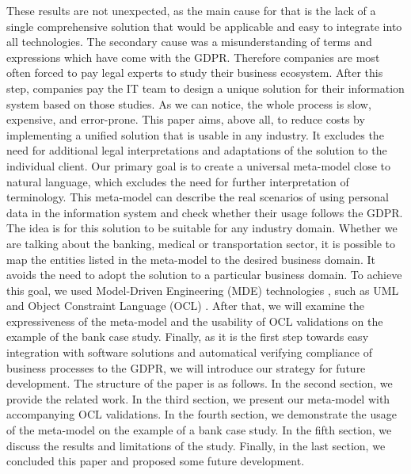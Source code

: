 \documentclass[11pt,english]{article}
\begin{document}
\newline These results are not unexpected, as the main cause for that is the lack of a single comprehensive solution that would be applicable and easy to integrate into all technologies. The secondary cause was a misunderstanding of terms and expressions which have come with the GDPR. Therefore companies are most often forced to pay legal experts to study their business ecosystem. After this step, companies pay the IT team to design a unique solution for their information system based on those studies. As we can notice, the whole process is slow, expensive, and error-prone. \newline This paper aims, above all, to reduce costs by implementing a unified solution that is usable in any industry. It excludes the need for additional legal interpretations and adaptations of the solution to the individual client. Our primary goal is to create a universal meta-model close to natural language, which excludes the need for further interpretation of terminology. This meta-model can describe the real scenarios of using personal data in the information system and check whether their usage follows the GDPR. The idea is for this solution to be suitable for any industry domain. Whether we are talking about the banking, medical or transportation sector, it is possible to map the entities listed in the meta-model to the desired business domain. It avoids the need to adopt the solution to a particular business domain. To achieve this goal, we used Model-Driven Engineering (MDE) technologies \cite{mde}, such as UML \cite{uml} and Object Constraint Language (OCL) \cite{ocl}. After that, we will examine the expressiveness of the meta-model and the usability of OCL validations on the example of the bank case study. Finally, as it is the first step towards easy integration with software solutions and automatical verifying compliance of business processes to the GDPR, we will introduce our strategy for future development. \newline The structure of the paper is as follows. In the second section, we provide the related work. In the third section, we present our meta-model with accompanying OCL validations. In the fourth section, we demonstrate the usage of the meta-model on the example of a bank case study. In the fifth section, we discuss the results and limitations of the study. Finally, in the last section, we concluded this paper and proposed some future development.
\end{document}
